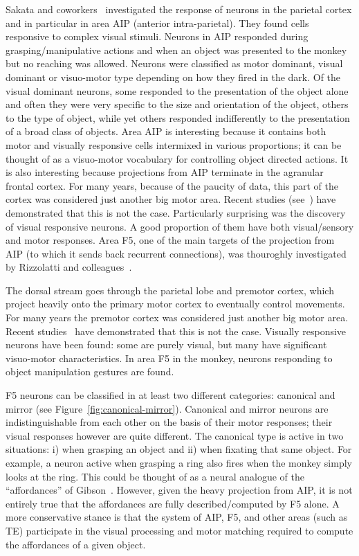 Sakata and coworkers~\cite{sakata-taira-kusunoki-murata-tanaka-1997} 
investigated the response of neurons in the 
parietal cortex and in particular in area AIP (anterior intra-parietal). They found 
cells responsive to complex visual stimuli. Neurons in AIP responded during 
grasping/manipulative actions and when an object was presented to the 
monkey but no reaching was allowed. Neurons were classified as motor dominant, 
visual dominant or visuo-motor type depending on how they fired in the dark. Of 
the visual dominant neurons, some responded to the presentation of the 
object alone and often they were very specific to the size and orientation of the 
object, others to the type of object, while yet others responded indifferently to the 
presentation of a broad class of objects. Area AIP is interesting because 
it contains both motor and visually responsive cells intermixed in various proportions; 
it can be thought of as a visuo-motor vocabulary for controlling object directed 
actions. It is also interesting because projections from AIP terminate in the 
agranular frontal cortex. For many years, because of the paucity of data, this 
part of the cortex was considered just another big motor area. Recent studies 
(see~\cite{jeannerod97cognitive,fadiga00visuomotor}) have demonstrated 
that this is not the case. Particularly surprising was the discovery of visual 
responsive neurons. A good proportion of them have both visual/sensory and motor 
responses. Area F5, one of the main targets of the projection from AIP (to which 
it sends back recurrent connections), was thouroghly investigated by Rizzolatti 
and colleagues~\cite{gallese-fadiga-fogassi-rizzolatti-1996}.

%
%
\ifverbose
The dorsal stream goes through the parietal lobe and premotor cortex,
which project heavily onto the primary motor cortex to eventually
control movements. For many years the premotor cortex was considered
just another big motor area.  Recent studies~\cite{jeannerod97cognitive} have demonstrated that this is not the
case.  Visually responsive neurons have been found: some are purely
visual, but many have significant visuo-motor characteristics. In area
F5 in the monkey, neurons responding to object manipulation gestures
are found.  
\fi

F5 neurons can be classified in at least two different categories:
canonical and mirror (see Figure~\ref{fig:canonical-mirror}). 
Canonical and mirror neurons are 
indistinguishable from each other on the basis of their motor responses; 
their visual responses however are quite different. 
The canonical type is active in two situations:
i) when grasping an object and ii) when fixating that same object.
For example, a neuron active when grasping a ring also fires when the
monkey simply looks at the ring.  This could be thought of as a neural
analogue of the ``affordances'' of Gibson~\cite{gibson77theory}. 
However, given the heavy projection from AIP, it is not entirely
true that the affordances are fully described/computed by F5 alone.
A more conservative stance is that the system of AIP, F5, and other areas 
(such as TE) participate in the visual processing and motor matching required 
to compute the affordances of a given object.  


